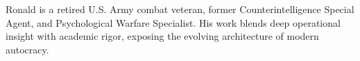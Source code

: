 
Ronald is a retired U.S. Army combat veteran, former Counterintelligence Special Agent, and Psychological Warfare Specialist. His work blends deep operational insight with academic rigor, exposing the evolving architecture of modern autocracy.\\

